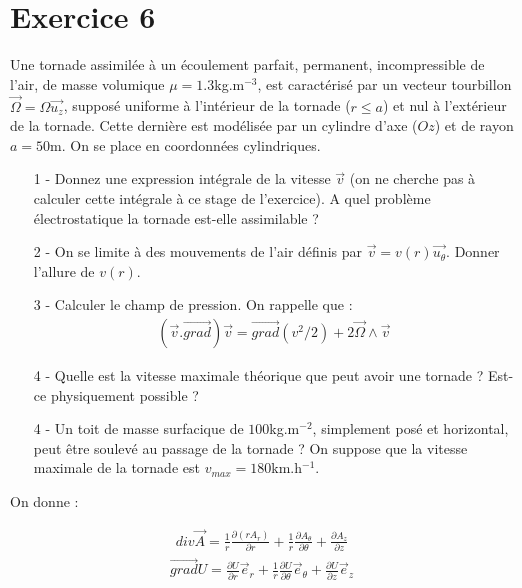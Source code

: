 \documentclass{report}
\begin{document}
\newpage

\section*{Exercice 6}

Une tornade assimilée à un écoulement parfait, permanent, incompressible de l'air, de masse volumique $\mu = 1.3$kg.m$^{-3}$, est caractérisé par un vecteur tourbillon $\vec{\Omega} = \Omega \vec{u_{z}}$, supposé uniforme à l'intérieur de la tornade ($r\leq a$) et nul à l'extérieur de la tornade. Cette dernière est modélisée par un cylindre d'axe ($Oz$) et de rayon $a=50$m. On se place en coordonnées cylindriques.

\begin{itemize}

	\item[1 - ] Donnez une expression intégrale de la vitesse $\vec{v}$ (on ne cherche pas à calculer cette intégrale à ce stage de l'exercice). A quel problème électrostatique la tornade est-elle assimilable ?
	\item[2 - ] On se limite à des mouvements de l'air définis par $\vec{v} = v(r)\vec{u_{\theta}}$. Donner l'allure de $v(r)$.
	\item[3 - ] Calculer le champ de pression. On rappelle que : 
	\begin{align*}
		(\vec{v}.\vec{grad})\vec{v} =\vec{grad}(v^{2}/2) + 2\vec{\Omega}\wedge \vec{v}
	\end{align*}
	\item[4 - ] Quelle est la vitesse maximale théorique que peut avoir une tornade ? Est-ce physiquement possible ?
	\item[4 - ] Un toit de masse surfacique de $100$kg.m$^{-2}$, simplement posé et horizontal, peut être soulevé au passage de la tornade ? On suppose que la vitesse maximale de la tornade est $v_{max} = 180$km.h$^{-1}$.
\end{itemize}

On donne :

\begin{align*}
	div\vec{A} = \frac{1}{r}\frac{\partial(rA_{r})}{\partial r} +\frac{1}{r}\frac{\partial A_{\theta}}{\partial\theta} + \frac{\partial A_{z}}{\partial z}
\end{align*}
\begin{align*}
	\vec{grad}U = \frac{\partial U}{\partial r}\vec{e}_{r} +\frac{1}{r}\frac{\partial U}{\partial\theta}\vec{e}_{\theta} + \frac{\partial U}{\partial z}\vec{e}_{z}
\end{align*}
\end{document}
